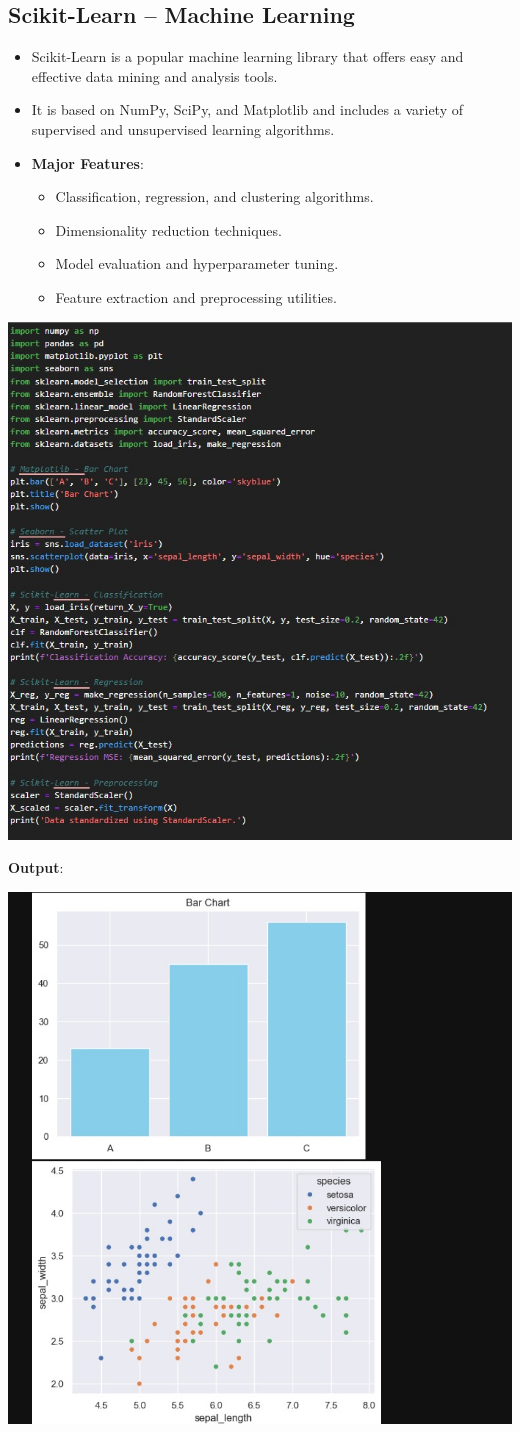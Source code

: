 \documentclass{article}
\begin{document}
\subsection{Scikit-Learn – Machine Learning}
\begin{itemize}
    \item Scikit-Learn is a popular machine learning library that offers easy and effective data mining and analysis tools.
    \item It is based on NumPy, SciPy, and Matplotlib and includes a variety of supervised and unsupervised learning algorithms.
    \item \textbf{Major Features}:
    \begin{itemize}
    \item Classification, regression, and clustering algorithms.
    \item Dimensionality reduction techniques.
    \item Model evaluation and hyperparameter tuning.
    \item Feature extraction and preprocessing utilities.
    \end{itemize}
\end{itemize}
\includegraphics[width=14cm,height=10
cm]{Scikit.jpeg}

\textbf{Output}:

\includegraphics[width=14cm,height=8
cm]{Scikit_Output.jpeg}
\newpage
\end{document}

